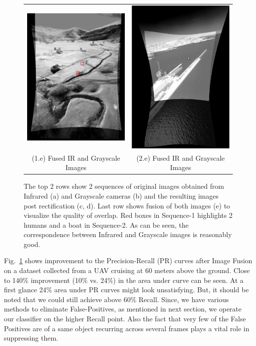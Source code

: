\documentclass[runningheads]{llncs}
\begin{document}
\begin{figure}
  \begin{tabular}{cc}
  	\includegraphics[width=6cm]{img/fusion/Roth/Grayscale_and_Infrared_overlaid_Image_screenshot.png} &
  	\includegraphics[width=6cm]{img/fusion/Sea/3/Grayscale_and_Infrared_overlaid_Image_screenshot.png} \\
  	\small (1.e) Fused IR and Grayscale Images &
  	\small (2.e) Fused IR and Grayscale Images
  \end{tabular}

  \caption{The top 2 rows show 2 sequences of original images obtained from Infrared (a) and Grayscale cameras (b) and the resulting images post rectification (c, d). Last row shows fusion of both images (e) to visualize the quality of overlap. Red boxes in Sequence-1 highlights 2 humans and a boat in Sequence-2. As can be seen, the correspondence between Infrared and Grayscale images is reasonably good.}\label{fig:fusion}
\end{figure}

Fig.~\ref{fig:fusion} shows improvement to the Precision-Recall (PR) curves after Image Fusion on a dataset collected from a UAV cruising at 60 meters above the ground. Close to 140\% improvement (10\% vs. 24\%) in the area under curve can be seen. At a first glance 24\% area under PR curves might look unsatisfying. But, it should be noted that we could still achieve above 60\% Recall. Since, we have various methods to eliminate False-Positives, as mentioned in next section, we operate our classifier on the higher Recall point. Also the fact that very few of the False Positives are of a same object recurring across several frames plays a vital role in suppressing them.
\end{document}
